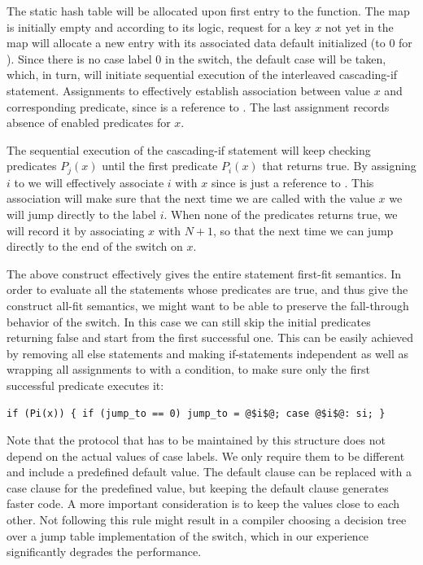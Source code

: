 \noindent
The static  hash table will be allocated upon first entry 
to the function. The map is initially empty and according to its logic, 
request for a key $x$ not yet in the map will allocate a 
new entry with its associated data default initialized (to 0 for ). Since 
there is no case label 0 in the switch, the default case will be taken, which, in 
turn, will initiate sequential execution of the interleaved cascading-if 
statement. Assignments to  effectively establish association 
between value $x$ and corresponding predicate, since  is a 
reference to . The last assignment records absence of 
enabled predicates for $x$.

The sequential execution of the cascading-if statement will keep checking 
predicates $P_j(x)$ until the first predicate $P_i(x)$ that returns true. By 
assigning $i$ to  we will effectively associate $i$ with $x$ since 
 is just a reference to . This association 
will make sure that the next time we are called with the value $x$ we will jump 
directly to the label $i$. When none of the predicates returns true, we will 
record it by associating $x$ with $N+1$, so that the next time we can jump 
directly to the end of the switch on $x$. 

The above construct effectively gives the entire statement first-fit semantics. 
In order to evaluate all the statements whose predicates are true, and thus 
give the construct all-fit semantics, we might want to be able to preserve the 
fall-through behavior of the switch. In this case we can still skip the initial 
predicates returning false and start from the first successful one. This can be 
easily achieved by removing all else statements and making if-statements 
independent as well as wrapping all assignments to  with a condition, 
to make sure only the first successful predicate executes it:

\begin{lstlisting}
if (Pi(x)) { if (jump_to == 0) jump_to = @$i$@; case @$i$@: si; }
\end{lstlisting}

\noindent
Note that the protocol that has to be maintained by this structure does not 
depend on the actual values of case labels. We only require them to be 
different and include a predefined default value. The default clause can be 
replaced with a case clause for the predefined value, but keeping the default  
clause generates faster code. A more important consideration is to 
keep the values close to each other. Not following this rule might result in a 
compiler choosing a decision tree over a jump table implementation of the 
switch, which in our experience significantly degrades the performance.

